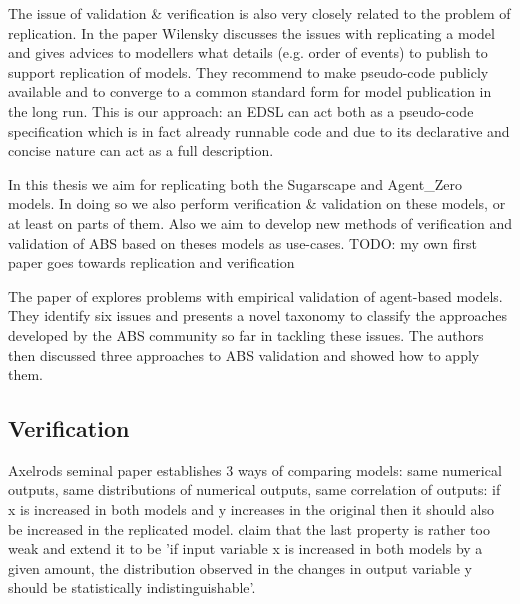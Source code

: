 The issue of validation \& verification is also very closely related to the problem of replication. In the paper \cite{wilensky_making_2007} Wilensky discusses the issues with replicating a model and gives advices to modellers what details (e.g. order of events) to publish to support replication of models. They recommend to make pseudo-code publicly available and to converge to a common standard form for model publication in the long run. This is our approach: an EDSL can act both as a pseudo-code specification which is in fact already runnable code and due to its declarative and concise nature can act as a full description.
  
In this thesis we aim for replicating both the Sugarscape \cite{epstein_growing_1996} and Agent\_Zero \cite{epstein_agent_zero:_2014} models. In doing so we also perform verification \& validation on these models, or at least on parts of them. Also we aim to develop new methods of verification and validation of ABS based on theses models as use-cases. TODO: my own first paper goes towards replication and verification

The paper of \cite{windrum_empirical_2007} explores problems with empirical validation of agent-based models. They identify six issues and presents a novel taxonomy to classify the approaches developed by the ABS community so far in tackling these issues. The authors then discussed three approaches to ABS validation and showed how to apply them.

\subsection{Verification}
Axelrods seminal paper \cite{axelrod_advancing_1997} establishes 3 ways of comparing models: same numerical outputs, same distributions of numerical outputs, same correlation of outputs: if x is increased in both models and y increases in the original then it should also be increased in the replicated model. \cite{ormerod_epistemological_2009} claim that the last property is rather too weak and extend it to be 'if input variable x is increased in both models by a given amount, the distribution observed in the changes in output variable y should be statistically indistinguishable'.

